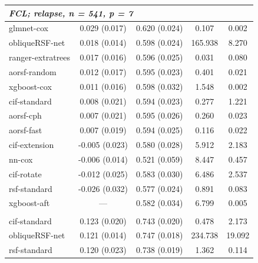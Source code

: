 \documentclass[12pt]{article}\usepackage[]{graphicx}\usepackage[]{xcolor}
\newenvironment{knitrout}{}{} %
\begin{document}
\begin{knitrout}
\begin{longtable}[t]{lcccc}
\multicolumn{5}{l}{\textit{\textbf{FCL; relapse, n = 541, p = 7}}}\\
\hline
\hspace{1em}glmnet-cox & 0.029 (0.017) & 0.620 (0.024) & 0.107 & 0.002\\
\hspace{1em}obliqueRSF-net & 0.018 (0.014) & 0.598 (0.024) & 165.938 & 8.270\\
\hspace{1em}ranger-extratrees & 0.017 (0.016) & 0.596 (0.025) & 0.031 & 0.080\\
\hspace{1em}aorsf-random & 0.012 (0.017) & 0.595 (0.023) & 0.401 & 0.021\\
\hspace{1em}xgboost-cox & 0.011 (0.016) & 0.598 (0.032) & 1.548 & 0.002\\
\hspace{1em}cif-standard & 0.008 (0.021) & 0.594 (0.023) & 0.277 & 1.221\\
\hspace{1em}aorsf-cph & 0.007 (0.021) & 0.595 (0.026) & 0.260 & 0.023\\
\hspace{1em}aorsf-fast & 0.007 (0.019) & 0.594 (0.025) & 0.116 & 0.022\\
\hspace{1em}cif-extension & -0.005 (0.023) & 0.580 (0.028) & 5.912 & 2.183\\
\hspace{1em}nn-cox & -0.006 (0.014) & 0.521 (0.059) & 8.447 & 0.457\\
\hspace{1em}cif-rotate & -0.012 (0.025) & 0.583 (0.030) & 6.486 & 2.537\\
\hspace{1em}rsf-standard & -0.026 (0.032) & 0.577 (0.024) & 0.891 & 0.083\\
\hspace{1em}xgboost-aft & --- & 0.582 (0.034) & 6.799 & 0.005\\
\addlinespace[0.3em]
\multicolumn{5}{l}{\textit{\textbf{GBSG II; recurrence or death, n = 686, p = 10}}}\\
\hline
\hspace{1em}cif-standard & 0.123 (0.020) & 0.743 (0.020) & 0.478 & 2.173\\
\hspace{1em}obliqueRSF-net & 0.121 (0.014) & 0.747 (0.018) & 234.738 & 19.092\\
\hspace{1em}rsf-standard & 0.120 (0.023) & 0.738 (0.019) & 1.362 & 0.114\\

\end{longtable}
\end{knitrout}
\end{document}
